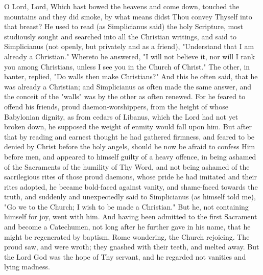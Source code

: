 \documentclass[b5paper,openright,12pt,twoside]{book}
\begin{document}
O Lord, Lord, Which hast bowed the heavens and come down, touched the
mountains and they did smoke, by what means didst Thou convey Thyself
into that breast? He used to read (as Simplicianus said) the holy
Scripture, most studiously sought and searched into all the Christian
writings, and said to Simplicianus (not openly, but privately and as
a friend), "Understand that I am already a Christian." Whereto he
answered, "I will not believe it, nor will I rank you among Christians,
unless I see you in the Church of Christ." The other, in banter,
replied, "Do walls then make Christians?" And this he often said, that
he was already a Christian; and Simplicianus as often made the same
answer, and the conceit of the "walls" was by the other as often
renewed. For he feared to offend his friends, proud daemon-worshippers,
from the height of whose Babylonian dignity, as from cedars of Libanus,
which the Lord had not yet broken down, he supposed the weight of enmity
would fall upon him. But after that by reading and earnest thought he
had gathered firmness, and feared to be denied by Christ before the holy
angels, should he now be afraid to confess Him before men, and appeared
to himself guilty of a heavy offence, in being ashamed of the Sacraments
of the humility of Thy Word, and not being ashamed of the sacrilegious
rites of those proud daemons, whose pride he had imitated and their
rites adopted, he became bold-faced against vanity, and shame-faced
towards the truth, and suddenly and unexpectedly said to Simplicianus
(as himself told me), "Go we to the Church; I wish to be made a
Christian." But he, not containing himself for joy, went with him. And
having been admitted to the first Sacrament and become a Catechumen, not
long after he further gave in his name, that he might be regenerated by
baptism, Rome wondering, the Church rejoicing. The proud saw, and were
wroth; they gnashed with their teeth, and melted away. But the Lord
God was the hope of Thy servant, and he regarded not vanities and lying
madness.
\end{document}
